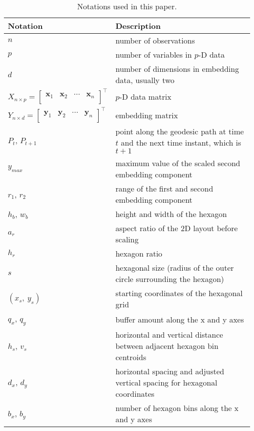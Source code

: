 \documentclass[
  12pt]{article}
\begin{document}
\begin{table}[H]

\caption{\label{tab:tbl-notations}Notations used in this paper.}
\centering
\fontsize{12}{14}\selectfont
\begin{tabular}[t]{>{\raggedright\arraybackslash}p{5cm}>{\raggedright\arraybackslash}p{12cm}}
\toprule
\textbf{Notation} & \textbf{Description}\\
\midrule
$n$ & number of observations\\
$p$ & number of variables in $p$-D data\\
$d$ & number of dimensions in embedding data, usually two\\
$X_{n \times p} = \begin{bmatrix} \textbf{x} _{1} & \textbf{x}_ {2} & \cdots & \textbf{x}_{n} \\  \end{bmatrix}^\top$ & $p$-D data matrix\\
$Y_{n \times d} = \begin{bmatrix} \textbf{y} _{1} & \textbf{y}_ {2} & \cdots & \textbf{y}_{n} \\  \end{bmatrix}^\top$ & embedding matrix\\
\addlinespace
$P_t$, $P_{t+1}$ & point along the geodesic path at time $t$ and the next time instant, which is $t+1$\\
$y_{max}$ & maximum value of the scaled second embedding component\\
$r_1$, $r_2$ & range of the first and  second embedding component\\
$h_b$, $w_b$ & height and width of the hexagon\\
$a_r$ & aspect ratio of the 2D layout before scaling\\
\addlinespace
$h_r$ & hexagon ratio\\
$s$ & hexagonal size (radius of the outer circle surrounding the hexagon)\\
$(x_s, \ y_s)$ & starting coordinates of the hexagonal grid\\
$q_x$, $q_y$ & buffer amount along the x and y axes\\
$h_s$, $v_s$ & horizontal and vertical distance between adjacent hexagon bin centroids\\
\addlinespace
$d_x$, $d_y$ & horizontal spacing and adjusted vertical spacing for hexagonal coordinates\\
$b_x$, $b_y$ & number of hexagon bins along the x and y axes\\

\end{tabular}
\end{table}
\end{document}
